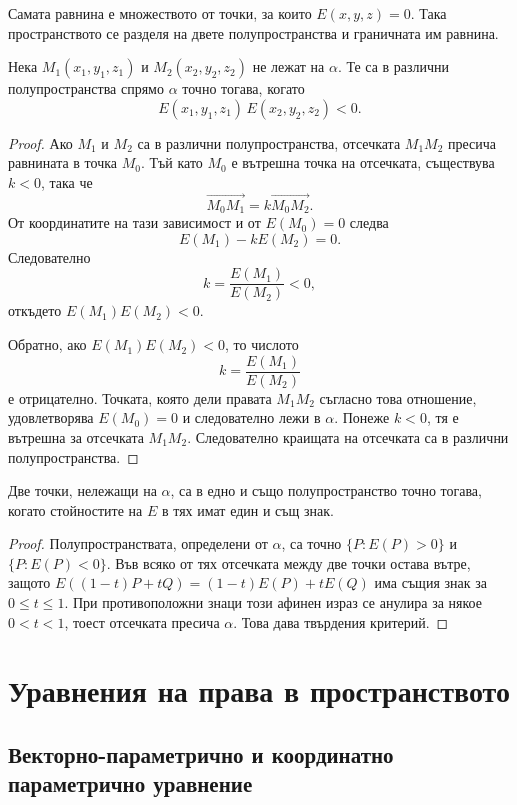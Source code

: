 Самата равнина е множеството от точки, за които $E(x,y,z)=0$. Така пространството се разделя на двете полупространства и граничната им равнина.

\begin{keythm}
Нека $M_1(x_1,y_1,z_1)$ и $M_2(x_2,y_2,z_2)$ не лежат на $\alpha$. Те са в различни полупространства спрямо $\alpha$ точно тогава, когато
\[
\boxed{
E(x_1,y_1,z_1)\,E(x_2,y_2,z_2)<0.}
\]
\end{keythm}

\begin{proof}
Ако $M_1$ и $M_2$ са в различни полупространства, отсечката $M_1M_2$ пресича равнината в точка $M_0$. Тъй като $M_0$ е вътрешна точка на отсечката, съществува $k<0$, така че
\[
\overrightarrow{M_0M_1}=k\overrightarrow{M_0M_2}.
\]
От координатите на тази зависимост и от $E(M_0)=0$ следва
\[
E(M_1)-kE(M_2)=0.
\]
Следователно
\[
k=\frac{E(M_1)}{E(M_2)}<0,
\]
откъдето $E(M_1)E(M_2)<0$.

Обратно, ако $E(M_1)E(M_2)<0$, то числото
\[
k=\frac{E(M_1)}{E(M_2)}
\]
е отрицателно. Точката, която дели правата $M_1M_2$ съгласно това отношение, удовлетворява $E(M_0)=0$ и следователно лежи в $\alpha$. Понеже $k<0$, тя е вътрешна за отсечката $M_1M_2$. Следователно краищата на отсечката са в различни полупространства.
\end{proof}

\begin{cor}
Две точки, нележащи на $\alpha$, са в едно и също полупространство точно тогава, когато стойностите на $E$ в тях имат един и същ знак.
\end{cor}

\begin{proof}
Полупространствата, определени от $\alpha$, са точно $\{P:E(P)>0\}$ и $\{P:E(P)<0\}$. Във всяко от тях отсечката между две точки остава вътре, защото $E((1-t)P+tQ)=(1-t)E(P)+tE(Q)$ има същия знак за $0\le t\le1$. При противоположни знаци този афинен израз се анулира за някое $0<t<1$, тоест отсечката пресича $\alpha$. Това дава твърдения критерий.
\end{proof}

\section{Уравнения на права в пространството}\label{s:29.6}

\subsection{Векторно-параметрично и координатно параметрично уравнение}\label{s:29.6.1}


